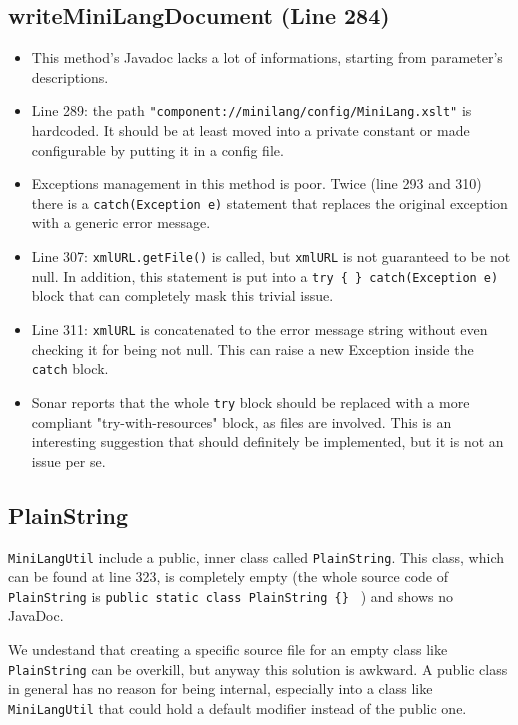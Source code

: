 \documentclass[11pt]{article} %
\begin{document}
\subsection{writeMiniLangDocument (Line 284)}
\begin{itemize}
	\item This method's Javadoc lacks a lot of informations, starting from parameter's descriptions.
	\item Line 289: the path \texttt{"component://minilang/config/MiniLang.xslt"} is hardcoded. It should be at least moved into a private constant or made configurable by putting it in a config file.
	\item Exceptions management in this method is poor. Twice (line 293 and 310) there is a \texttt{catch(Exception e)} statement that replaces the original exception with a generic error message.
	\item Line 307: \texttt{xmlURL.getFile()} is called, but \texttt{xmlURL} is not guaranteed to be not null. In addition, this statement is put into a \texttt{try \{ \} catch(Exception e)} block that can completely mask this trivial issue.
	\item Line 311: \texttt{xmlURL} is concatenated to the error message string without even checking it for being not null. This can raise a new Exception inside the \texttt{catch} block.
	\item Sonar reports that the whole \texttt{try} block should be replaced with a more compliant "try-with-resources" block, as files are involved. This is an interesting suggestion that should definitely be implemented, but it is not an issue per se.
\end{itemize}

\subsection{PlainString}

\texttt{MiniLangUtil} include a public, inner class called \texttt{PlainString}. This class, which can be found at line 323, is completely empty (the whole source code of \texttt{PlainString} is \texttt{public static class PlainString \{\} }  ) and shows no JavaDoc.

We undestand that creating a specific source file for an empty class like \texttt{PlainString} can be overkill, but anyway this solution is awkward. A public class in general has no reason for being internal, especially into a class like \texttt{MiniLangUtil} that could hold a default modifier instead of the public one.
\end{document}
